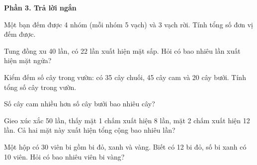 \textbf{Phần 3. Trả lời ngắn}

\begin{ex} %
Một bạn đếm được 4 nhóm (mỗi nhóm 5 vạch) và 3 vạch rời. Tính tổng số đơn vị đếm được.
\end{ex}

\begin{ex} %
Tung đồng xu 40 lần, có 22 lần xuất hiện mặt sấp. Hỏi có bao nhiêu lần xuất hiện mặt ngửa?
\end{ex}

\begin{ex} %
Kiểm đếm số cây trong vườn: có 35 cây chuối, 45 cây cam và 20 cây bưởi. Tính tổng số cây trong vườn.
\end{ex}

\begin{ex} %
Số cây cam nhiều hơn số cây bưởi bao nhiêu cây?
\end{ex}

\begin{ex} %
Gieo xúc xắc 50 lần, thấy mặt 1 chấm xuất hiện 8 lần, mặt 2 chấm xuất hiện 12 lần. Cả hai mặt này xuất hiện tổng cộng bao nhiêu lần?
\end{ex}

\begin{ex} %
Một hộp có 30 viên bi gồm bi đỏ, xanh và vàng. Biết có 12 bi đỏ, số bi xanh có 10 viên. Hỏi có bao nhiêu viên bi vàng?
\end{ex}
